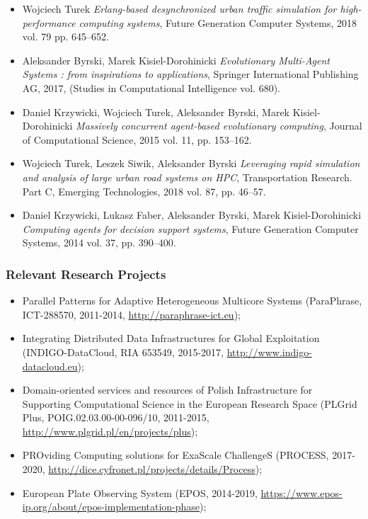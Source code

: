 \documentclass[a4paper,11pt]{article}
\begin{document}
\begin{itemize}
\item Wojciech Turek \emph{Erlang-based desynchronized urban traffic simulation for high-performance computing systems}, Future Generation Computer Systems, 2018 vol. 79 pp. 645--652.

\item Aleksander Byrski, Marek Kisiel-Dorohinicki \emph{Evolutionary Multi-Agent Systems : from inspirations to applications}, Springer International Publishing AG,  2017, (Studies in Computational Intelligence vol. 680).

\item Daniel Krzywicki, Wojciech Turek, Aleksander Byrski, Marek Kisiel-Dorohinicki \emph{Massively concurrent agent-based evolutionary computing}, Journal of Computational Science, 2015 vol. 11, pp. 153--162.

\item Wojciech Turek, Leszek Siwik, Aleksander Byrski \emph{Leveraging rapid simulation and analysis of large urban road systems on HPC}, Transportation Research. Part C, Emerging Technologies, 2018 vol. 87, pp. 46--57.

\item Daniel Krzywicki, Lukasz Faber, Aleksander Byrski, Marek Kisiel-Dorohinicki \emph{Computing agents for decision support systems}, Future Generation Computer Systems, 2014 vol. 37, pp. 390--400.
\end{itemize}

\subsubsection*{Relevant Research Projects}

\begin{itemize}
\item
Parallel Patterns for Adaptive Heterogeneous Multicore Systems (ParaPhrase, ICT-288570, 2011-2014, \url{http://paraphrase-ict.eu});

\item 
Integrating Distributed Data Infrastructures for Global Exploitation (INDIGO-DataCloud, RIA 653549, 2015-2017, \url{http://www.indigo-datacloud.eu});

\item 
Domain-oriented services and resources of Polish Infrastructure for Supporting Computational Science in the European Research Space (PLGrid Plus,  POIG.02.03.00-00-096/10, 2011-2015, \url{http://www.plgrid.pl/en/projects/plus});

\item
PROviding Computing solutions for ExaScale ChallengeS (PROCESS, 2017-2020, \url{http://dice.cyfronet.pl/projects/details/Process});

\item
European Plate Observing System (EPOS, 2014-2019, \url{https://www.epos-ip.org/about/epos-implementation-phase});







\end{itemize}
\end{document}
